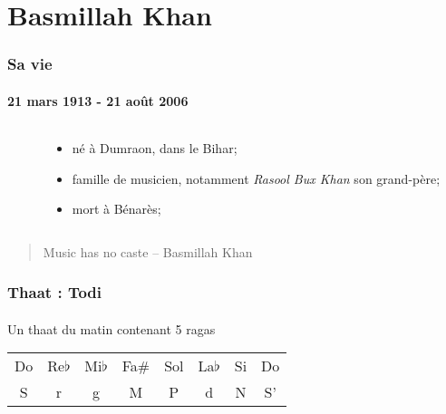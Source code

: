 \documentclass[12pt]{beamer}
\begin{document}
\section[]{Basmillah Khan}
\begin{frame}
        \frametitle{Sa vie}
        \framesubtitle{21 mars 1913 - 21 août 2006}

        \begin{columns}[c] %
        	\begin{column}{5.5cm} %
        	\end{column}
        	\begin{column}{5.0cm} %
        		\begin{itemize}
				\item né à Dumraon, dans le Bihar;
		\bigskip
				\item famille de musicien, notamment \textit{Rasool Bux Khan} son grand-père;
		\bigskip
				\item mort à Bénarès;
        		\end{itemize}
        	\end{column}
        \end{columns}

		\bigskip
        \begin{center}
        	\begin{quote}
			Music has no caste -- Basmillah Khan
        	\end{quote}
        \end{center}

\end{frame}


                

\begin{frame}
        \frametitle{Thaat : Todi}
        \framesubtitle{}
	Un thaat du matin contenant 5 ragas\\
	\bigskip
        \begin{tabular*}{0.75\textwidth}{ c | c | c | c | c | c | c | c}
		Do & Re$\flat$ & Mi$\flat$ & Fa\# & Sol & La$\flat$ & Si & Do\\
		S & r & g & M & P & d & N & S'
        \end{tabular*}
	
\end{frame}
\end{document}
